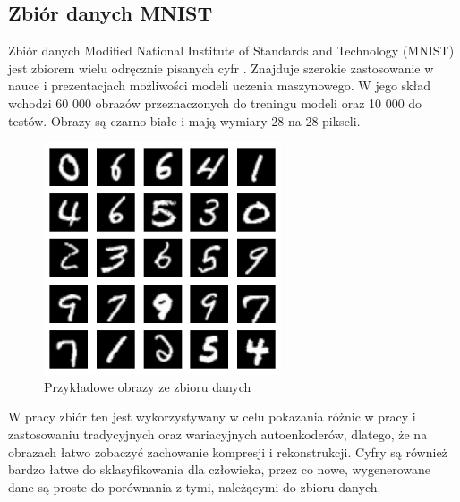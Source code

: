 \documentclass[a4paper,12pt,oneside]{book} %
\begin{document}
\subsection{Zbiór danych MNIST}
Zbiór danych Modified National Institute of Standards and Technology (MNIST) jest zbiorem wielu odręcznie pisanych cyfr \cite{mnist}. Znajduje szerokie zastosowanie w nauce i prezentacjach możliwości modeli uczenia maszynowego. W jego skład wchodzi 60 000 obrazów przeznaczonych do treningu modeli oraz 10 000 do testów. Obrazy są czarno-białe i mają wymiary 28 na 28 pikseli.
\begin{figure}[h]
	\centering\includegraphics[width=7cm]{pictures/mnist.png}
	\caption{Przykładowe obrazy ze zbioru danych}
\end{figure}

W pracy zbiór ten jest wykorzystywany w celu pokazania różnic w pracy i zastosowaniu tradycyjnych oraz wariacyjnych autoenkoderów, dlatego, że na obrazach łatwo zobaczyć zachowanie kompresji i rekonstrukcji. Cyfry są również bardzo łatwe do sklasyfikowania dla człowieka, przez co nowe, wygenerowane dane są proste do porównania z tymi, należącymi do zbioru danych.
\newpage
\end{document}
